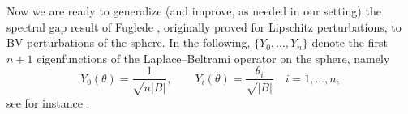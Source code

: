 \documentclass[reqno,11pt]{amsart}
\def\sz{\sigma}
\numberwithin{equation}{section}
\theoremstyle{remark}
\begin{document}
%

Now we are ready to generalize (and improve, as needed in our setting) the spectral gap result of Fuglede \cite{Fuglede1989}, originally proved for Lipschitz perturbations, to BV perturbations of the sphere.
In the following, $\{Y_0,\ldots,Y_n\}$ denote the first $n+1$ eigenfunctions of the Laplace--Beltrami operator on the sphere, namely
\begin{equation}
    \label{LB}
    Y_0(\theta)=\frac{1}{\sqrt{n|B|}},\qquad Y_i(\theta)=\frac{\theta_i}{\sqrt{|B|}}\quad i=1,\ldots,n,
\end{equation}
see for instance \cite[Proof of Theorem 3.1, Step 3]{F2015}.
 
\end{document}
